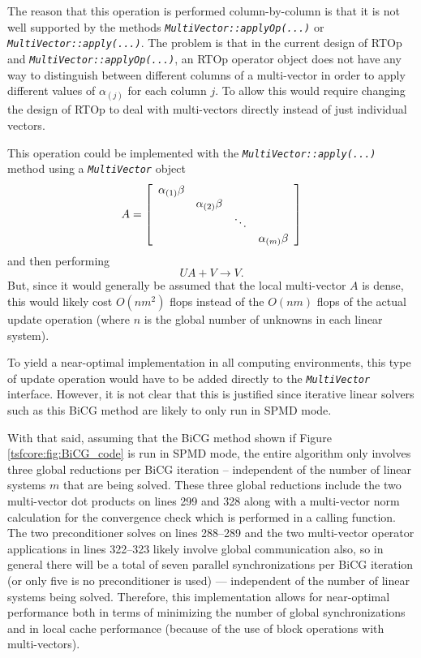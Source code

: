 The reason that this operation is performed column-by-column is that
it is not well supported by the methods
{}\texttt{\textit{Multi\-Vector\-::applyOp(\-...)}} or
{}\texttt{\textit{Multi\-Vector\-::apply(\-...)}}.  The problem is
that in the current design of RTOp and
{}\texttt{\textit{Multi\-Vector\-::applyOp(\-...)}}, an RTOp operator
object does not have any way to distinguish between different columns
of a multi-vector in order to apply different values of $\alpha_{(j)}$
for each column $j$.  To allow this would require changing the design
of RTOp to deal with multi-vectors directly instead of just individual
vectors.

This operation could be implemented with the
{}\texttt{\textit{Multi\-Vector\-::apply(\-...)}} method using a
{}\texttt{\textit{Multi\-Vector}} object
%
\[
A = {\bmat{cccc} \alpha_{(1)} \beta \\ & \alpha_{(2)} \beta \\ & & \ddots \\ & & & \alpha_{(m)} \beta \emat}
\]
%
and then performing
%
\[
U A + V \rightarrow V.
\]
%
But, since it would generally be assumed that the local multi-vector
$A$ is dense, this would likely cost $O(n m^2)$ flops instead of the
$O(n m)$ flops of the actual update operation (where $n$ is the global
number of unknowns in each linear system).

To yield a near-optimal implementation in all computing environments,
this type of update operation would have to be added directly to the
{}\texttt{\textit{Multi\-Vector}} interface.  However, it is not clear
that this is justified since iterative linear solvers such as this
BiCG method are likely to only run in SPMD mode.

With that said, assuming that the BiCG method shown if Figure
{}\ref{tsfcore:fig:BiCG_code} is run in SPMD mode, the entire
algorithm only involves three global reductions per BiCG iteration --
independent of the number of linear systems $m$ that are being solved.
These three global reductions include the two multi-vector dot
products on lines 299 and 328 along with a multi-vector norm
calculation for the convergence check which is performed in a calling
function.  The two preconditioner solves on lines 288--289 and the two
multi-vector operator applications in lines 322--323 likely involve
global communication also, so in general there will be a total of
seven parallel synchronizations per BiCG iteration (or only five is no
preconditioner is used) --- independent of the number of linear
systems being solved.  Therefore, this implementation allows for
near-optimal performance both in terms of minimizing the number of
global synchronizations and in local cache performance (because of the
use of block operations with multi-vectors).

